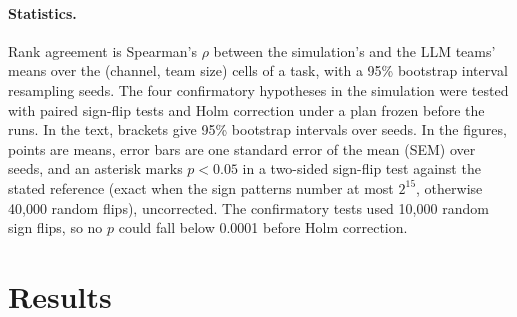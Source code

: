\documentclass{article}
\begin{document}
\paragraph{Statistics.} Rank agreement is Spearman's $\rho$ between the simulation's and the LLM teams' means over the (channel, team size) cells of a task, with a 95\% bootstrap interval resampling seeds. The four confirmatory hypotheses in the simulation were tested with paired sign-flip tests and Holm correction under a plan frozen before the runs. In the text, brackets give 95\% bootstrap intervals over seeds. In the figures, points are means, error bars are one standard error of the mean (SEM) over seeds, and an asterisk marks $p < 0.05$ in a two-sided sign-flip test against the stated reference (exact when the sign patterns number at most $2^{15}$, otherwise 40{,}000 random flips), uncorrected. The confirmatory tests used 10{,}000 random sign flips, so no $p$ could fall below 0.0001 before Holm correction.

\section{Results}
\end{document}
